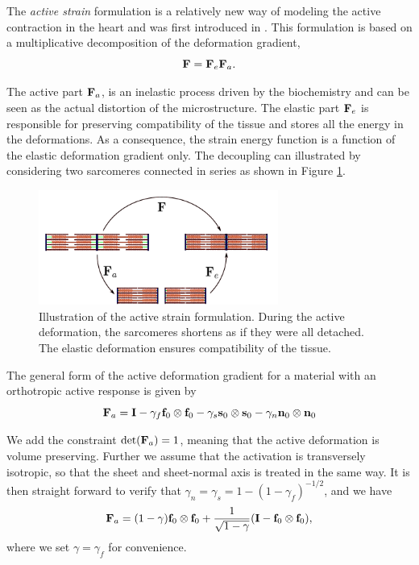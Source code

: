 The \emph{active strain} formulation is a relatively new way of modeling the
active contraction in the heart and was first introduced in
\cite{taber2000modeling}. This formulation is based on a
multiplicative decomposition of the deformation gradient, 
\begin{equation}
 \mathbf{F} = \mathbf{F}_e \mathbf{F}_a.
\label{eq:active_strain}
\end{equation}


The active part $\mathbf{F}_a$, is an inelastic process driven by the
biochemistry and can be seen as the actual distortion of the
microstructure. The elastic part $\mathbf{F}_e$ is responsible for preserving
compatibility of the tissue and stores all the energy in the
deformations. As a consequence, the strain energy function is a
function of the elastic deformation gradient only. The
decoupling can illustrated by considering two sarcomeres connected in
series as shown in Figure \ref{fig:actstrain}. 

\begin{figure}[htbp]
  \centering
    \includegraphics[width=0.7\textwidth]{chapters/introduction/figures/actstrain.pdf}
\caption{Illustration of the active strain formulation. During the active
deformation, the sarcomeres shortens as if they were all detached. The
elastic deformation ensures compatibility of the tissue.}
\label{fig:actstrain}
\end{figure}


The general form of the active deformation gradient for a
material with an orthotropic active response is given by
\begin{equation}
  \mathbf{F}_a =  \mathbf{I}
  - \gamma_f \mathbf{f}_0 \otimes \mathbf{f}_0
  - \gamma_s \mathbf{s}_0 \otimes \mathbf{s}_0
  - \gamma_n \mathbf{n}_0\otimes \mathbf{n}_0
 \label{eq:active_strain_Fa_general}
\end{equation}

We add the constraint $\det(\mathbf{F}_a) = 1$, meaning that the active
deformation is volume preserving. Further we assume that the activation is
transversely isotropic, so that the sheet and sheet-normal axis is
treated in the same way. It is then straight forward to verify that
$\gamma_n = \gamma_s =1- (1-\gamma_f)^{-1/2}$, and we have
\begin{equation}
  \mathbf{F}_a = (1 - \gamma) \mathbf{f}_0 \otimes \mathbf{f}_0  + \frac{1}{\sqrt{1 - \gamma}} (\mathbf{I} - \mathbf{f}_0 \otimes \mathbf{f}_0), 
 \label{eq:intro_active_strain_Fa_gjerald}
\end{equation}
where we set $\gamma = \gamma_f$ for convenience. 


